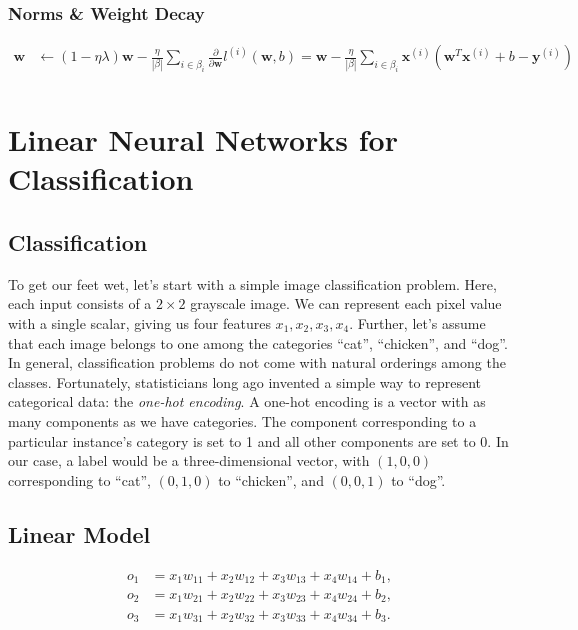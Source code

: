 \documentclass[a4paper,12pt]{article}
\theoremstyle{definition}
\begin{document}
\subsubsection*{Norms \& Weight Decay}

\begin{align*}
    \mathbf{w} & \leftarrow (1-\eta\lambda)\mathbf{w} - \frac{\eta}{|\beta|}\sum_{i\in\beta_i}\frac{\partial}{\partial\mathbf{w}}l^{(i)}(\mathbf{w},b) = \mathbf{w}- \frac{\eta}{|\beta|}\sum_{i\in\beta_i}\mathbf{x}^{(i)}(\mathbf{w}^T\mathbf{x}^{(i)} + b - \mathbf{y}^{(i)}) \\
\end{align*}


\section{Linear Neural Networks for Classification}

\subsection*{Classification}
To get our feet wet, let's start with a simple image classification problem. Here, each input consists of a $2\times2$
grayscale image. We can represent each pixel value with a single scalar, giving us four features $x_1, x_2, x_3, x_4$.
Further, let's assume that each image belongs to one among the categories “cat”, “chicken”, and “dog”.
\newline
In general, classification problems do not come with natural orderings among the classes. Fortunately, statisticians long ago invented a
simple way to represent categorical data: the \emph{one-hot encoding}. A one-hot encoding is a vector with as many components as we have
categories. The component corresponding to a particular instance’s category is set to 1 and all other components are set to 0. In our case,
a label would be a three-dimensional vector, with $(1,0,0)$ corresponding to “cat”, $(0,1,0)$ to “chicken”, and $(0,0,1)$ to “dog”.
\subsection*{Linear Model}

\begin{align*}
    o_1 & = x_1 w_{11} + x_2 w_{12} + x_3 w_{13} + x_4 w_{14} + b_1, \\
    o_2 & = x_1 w_{21} + x_2 w_{22} + x_3 w_{23} + x_4 w_{24} + b_2, \\
    o_3 & = x_1 w_{31} + x_2 w_{32} + x_3 w_{33} + x_4 w_{34} + b_3.
\end{align*}
\end{document}
